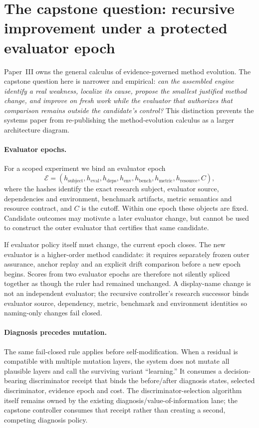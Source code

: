 \section{The capstone question: recursive improvement under a protected evaluator epoch}
\label{sec:evaluator-governed-recursion}

Paper~III owns the general calculus of evidence-governed method evolution.  The capstone question here is narrower and empirical: \emph{can the assembled engine identify a real weakness, localize its cause, propose the smallest justified method change, and improve on fresh work while the evaluator that authorizes that comparison remains outside the candidate's control?}  This distinction prevents the systems paper from re-publishing the method-evolution calculus as a larger architecture diagram.

\paragraph{Evaluator epochs.}
For a scoped experiment we bind an evaluator epoch
\[
\mathcal E=
(h_{\mathrm{subject}},h_{\mathrm{eval}},h_{\mathrm{deps}},h_{\mathrm{env}},
 h_{\mathrm{bench}},h_{\mathrm{metric}},h_{\mathrm{resource}},C),
\]
where the hashes identify the exact research subject, evaluator source, dependencies and environment, benchmark artifacts, metric semantics and resource contract, and $C$ is the cutoff.  Within one epoch these objects are fixed.  Candidate outcomes may motivate a later evaluator change, but cannot be used to construct the outer evaluator that certifies that same candidate.

If evaluator policy itself must change, the current epoch closes.  The new evaluator is a higher-order method candidate: it requires separately frozen outer assurance, anchor replay and an explicit drift comparison before a new epoch begins.  Scores from two evaluator epochs are therefore not silently spliced together as though the ruler had remained unchanged.  A display-name change is not an independent evaluator; the recursive controller's research successor binds evaluator source, dependency, metric, benchmark and environment identities so naming-only changes fail closed.

\paragraph{Diagnosis precedes mutation.}
The same fail-closed rule applies before self-modification.  When a residual is compatible with multiple mutation layers, the system does not mutate all plausible layers and call the surviving variant ``learning.''  It consumes a decision-bearing discriminator receipt that binds the before/after diagnosis states, selected discriminator, evidence epoch and cost.  The discriminator-selection algorithm itself remains owned by the existing diagnosis/value-of-information lane; the capstone controller consumes that receipt rather than creating a second, competing diagnosis policy.

